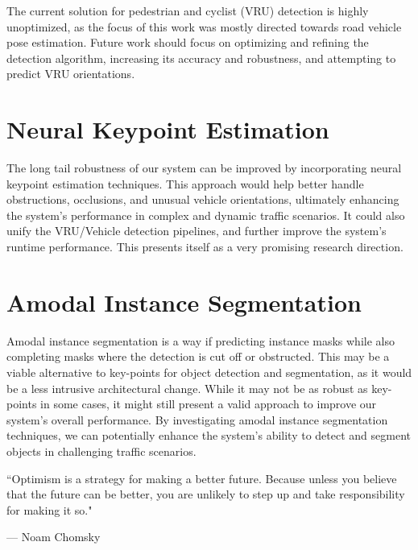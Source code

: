 The current solution for pedestrian and cyclist (VRU) detection is highly unoptimized, as the focus of this work was mostly directed towards road vehicle pose estimation.
Future work should focus on optimizing and refining the detection algorithm, increasing its accuracy and robustness, and attempting to predict VRU orientations.

\section{Neural Keypoint Estimation}
\label{sec:neuralkeypoints}

The long tail robustness of our system can be improved by incorporating neural keypoint estimation techniques.
This approach would help better handle obstructions, occlusions, and unusual vehicle orientations, ultimately enhancing the system's performance in complex and dynamic traffic scenarios.
It could also unify the VRU/Vehicle detection pipelines, and further improve the system's runtime performance.
This presents itself as a very promising research direction.

\section{Amodal Instance Segmentation}
\label{sec:amodal}

Amodal instance segmentation is a way if predicting instance masks while also completing masks where the detection is cut off or obstructed.
This may be a viable alternative to key-points for object detection and segmentation, as it would be a less intrusive architectural change.
While it may not be as robust as key-points in some cases, it might still present a valid approach to improve our system's overall performance.
By investigating amodal instance segmentation techniques, we can potentially enhance the system's ability to detect and segment objects in challenging traffic scenarios.

\par\vspace*{\fill}
\epigraph{``Optimism is a strategy for making a better future. Because unless you believe that the future can be better, you are unlikely to step up and take responsibility for making it so."}{--- \textup{Noam Chomsky}}
